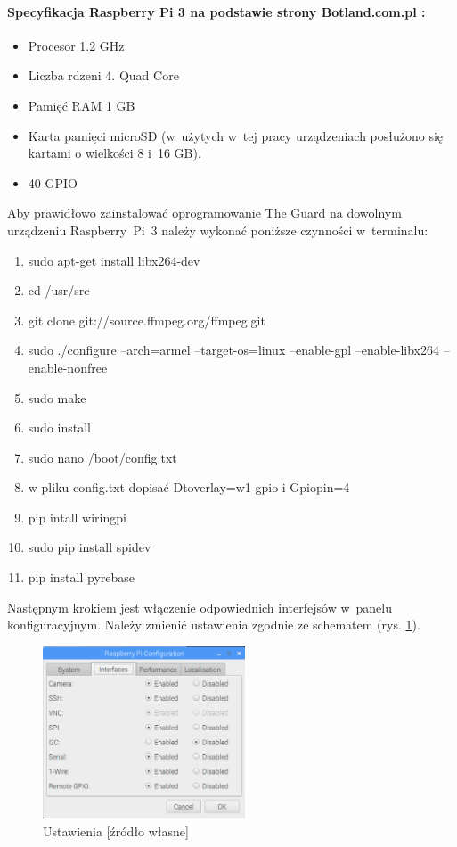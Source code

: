 \paragraph{Specyfikacja Raspberry Pi 3 na podstawie strony Botland.com.pl \cite{specyfikacja_rasp}:}
\begin{itemize} 
\item Procesor 1.2 GHz
\item Liczba rdzeni 4. Quad Core
\item Pamięć RAM 1 GB
\item Karta pamięci microSD (w~użytych w~tej pracy urządzeniach posłużono się kartami o wielkości 8 i~16 GB).
\item 40 GPIO
\end{itemize}
Aby prawidłowo zainstalować oprogramowanie The Guard na dowolnym urządzeniu Raspberry~Pi~3 należy wykonać poniższe czynności w~terminalu:
\begin{enumerate} 
\item sudo apt-get install libx264-dev
\item cd /usr/src
\item git clone git://source.ffmpeg.org/ffmpeg.git
\item sudo ./configure --arch=armel --target-os=linux --enable-gpl --enable-libx264 --enable-nonfree
\item sudo make
\item sudo install
\item sudo nano /boot/config.txt
\item w pliku config.txt dopisać Dtoverlay=w1-gpio i Gpiopin=4
\item pip intall wiringpi
\item sudo pip install spidev
\item pip install pyrebase
\end{enumerate}
Następnym krokiem jest włączenie odpowiednich interfejsów w~panelu konfiguracyjnym. Należy zmienić ustawienia zgodnie ze schematem (rys. \ref{rs_settings}).
\begin{figure}[H]
	\centering
	\includegraphics[width=6cm]{RSettings}
	\caption{Ustawienia [źródło własne]}
	\label{rs_settings}
\end{figure}

